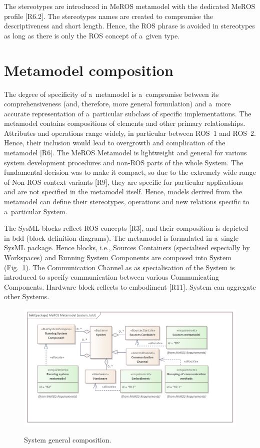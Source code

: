 \documentclass[11pt,oneside,a4paper]{report}
\begin{document}
	The stereotypes are introduced in MeROS metamodel with the dedicated MeROS profile [R6.2].
	The stereotypes names are created to compromise the descriptiveness and short length. Hence, the ROS phrase is avoided in stereotypes as long as there is only the ROS concept of a~given type.
	
	
	
\section{Metamodel composition}
\label{sec:metamodel-composition}

	The degree of specificity of a~metamodel is a~compromise between its comprehensiveness (and, therefore, more general formulation) and a~more accurate representation of a~particular subclass of specific implementations. The metamodel contains compositions of elements and other primary relationships. Attributes and operations range widely, in particular between ROS~1 and ROS~2. Hence, their inclusion would lead to overgrowth and complication of the metamodel [R6]. The MeROS Metamodel is lightweight and general for various system development procedures and non-ROS parts of the whole System. The fundamental decision was to make it compact, so due to the extremely wide range of Non-ROS context variants [R9], they are specific for particular applications and are not specified in the metamodel itself.
	Hence, models derived from the metamodel can define their stereotypes, operations and new relations specific to a~particular System. 
	
	
	The SysML blocks reflect ROS concepts [R3], and their composition is depicted in bdd (block definition diagrams). The metamodel is formulated in a~single SysML package. Hence blocks, i.e., Sources Containers (specialised especially by Workspaces) and Running System Components are composed into System (Fig.~\ref{fig:ros_system_bdd}). The Communication Channel as as specialisation of the System is introduced to specify communication between various Communicating Components. Hardware block reflects to embodiment [R11]. System can aggregate other Systems.
	
		
	\begin{figure}[H]
		\centering
		\begin{center}
			{\includegraphics[scale=1.0]{img/meros_pkg/system_bdd.png}}
		\end{center}
		\caption{System general composition.} 
		\label{fig:ros_system_bdd}
	\end{figure}
	
\end{document}
